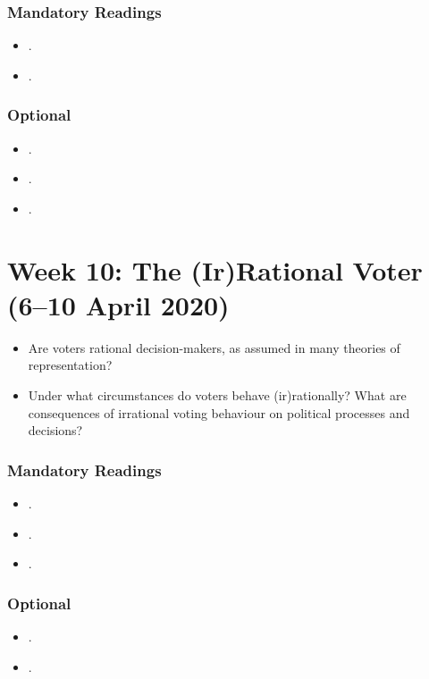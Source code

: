 \documentclass[abstract=on,parskip=full,headings=standardclasses,fontsize=11pt,paper=a4]{scrartcl}
\begin{document}
\subsubsection*{Mandatory Readings}

\begin{itemize}
\item {}.
\item {}.
\end{itemize}

\subsubsection*{Optional}
\begin{itemize}
\item {}.
\item {}.
\item {}.
\end{itemize}

 
\section{Week 10: The (Ir)Rational Voter (6--10 April 2020)}


\begin{itemize}
\renewcommand\labelitemi{--}
\item Are voters rational decision-makers, as assumed in many theories of representation? 
\item Under what circumstances do voters behave (ir)rationally? What are consequences of irrational voting behaviour on political processes and decisions?
\end{itemize}


\subsubsection*{Mandatory Readings}


 \begin{itemize}
\item {}.
\item {}.
\item {}.
\end{itemize}

\subsubsection*{Optional}
\begin{itemize}
\item {}.
\item {}.
\end{itemize}
\end{document}
